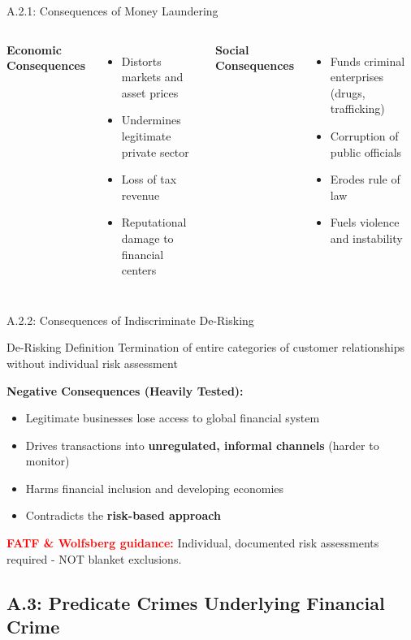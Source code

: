 \documentclass{beamer}
\begin{document}
	\begin{frame}{A.2.1: Consequences of Money Laundering}
		\begin{columns}
			\textbf{Economic Consequences}
			\begin{itemize}
				\item Distorts markets and asset prices
				\item Undermines legitimate private sector
				\item Loss of tax revenue
				\item Reputational damage to financial centers
			\end{itemize}
			\textbf{Social Consequences}
			\begin{itemize}
				\item Funds criminal enterprises (drugs, trafficking)
				\item Corruption of public officials
				\item Erodes rule of law
				\item Fuels violence and instability
			\end{itemize}
		\end{columns}
	\end{frame}
	
	\begin{frame}{A.2.2: Consequences of Indiscriminate De-Risking}
		\begin{block}{De-Risking Definition}
			Termination of entire categories of customer relationships without individual risk assessment
		\end{block}
		\textbf{Negative Consequences (Heavily Tested):}
		\begin{itemize}
			\item Legitimate businesses lose access to global financial system
			\item Drives transactions into \textbf{unregulated, informal channels} (harder to monitor)
			\item Harms financial inclusion and developing economies
			\item Contradicts the \textbf{risk-based approach}
		\end{itemize}
		\textcolor{red}{\textbf{FATF \& Wolfsberg guidance:}} Individual, documented risk assessments required - NOT blanket exclusions.
	\end{frame}
	
	\subsection{A.3: Predicate Crimes Underlying Financial Crime}
	
\end{document}
